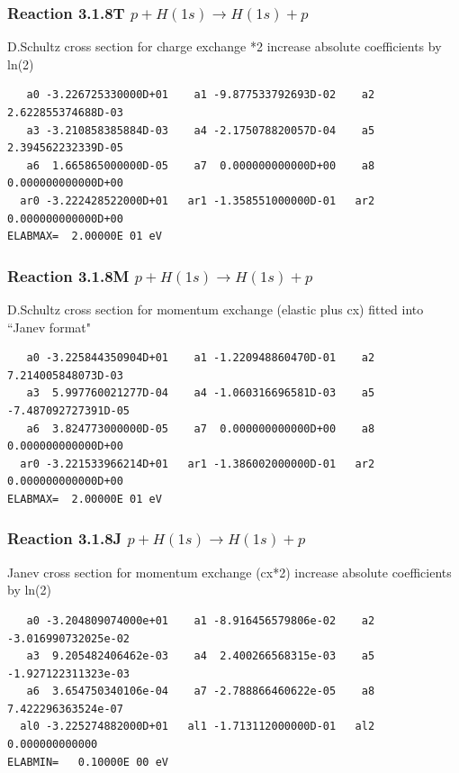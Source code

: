 \documentclass[12pt,dvips]{article}
\begin{document}
\subsubsection{
Reaction 3.1.8T $  p + H(1s) \rightarrow H(1s) + p  $
}
D.Schultz cross section for charge exchange *2
increase absolute coefficients by ln(2)

\begin{small}\begin{verbatim}
   a0 -3.226725330000D+01    a1 -9.877533792693D-02    a2  2.622855374688D-03
   a3 -3.210858385884D-03    a4 -2.175078820057D-04    a5  2.394562232339D-05
   a6  1.665865000000D-05    a7  0.000000000000D+00    a8  0.000000000000D+00
  ar0 -3.222428522000D+01   ar1 -1.358551000000D-01   ar2  0.000000000000D+00
ELABMAX=  2.00000E 01 eV
\end{verbatim}\end{small}

\subsubsection{
Reaction 3.1.8M $  p + H(1s) \rightarrow H(1s) + p  $
}
D.Schultz cross section for momentum exchange (elastic plus cx)
fitted into ``Janev format"

\begin{small}\begin{verbatim}
   a0 -3.225844350904D+01    a1 -1.220948860470D-01    a2  7.214005848073D-03
   a3  5.997760021277D-04    a4 -1.060316696581D-03    a5 -7.487092727391D-05
   a6  3.824773000000D-05    a7  0.000000000000D+00    a8  0.000000000000D+00
  ar0 -3.221533966214D+01   ar1 -1.386002000000D-01   ar2  0.000000000000D+00
ELABMAX=  2.00000E 01 eV
\end{verbatim}\end{small}
\subsubsection{
Reaction 3.1.8J $  p + H(1s) \rightarrow H(1s) + p  $
}
Janev cross section for momentum exchange (cx*2)
increase absolute coefficients by ln(2)

\begin{small}\begin{verbatim}
   a0 -3.204809074000e+01    a1 -8.916456579806e-02    a2 -3.016990732025e-02
   a3  9.205482406462e-03    a4  2.400266568315e-03    a5 -1.927122311323e-03
   a6  3.654750340106e-04    a7 -2.788866460622e-05    a8  7.422296363524e-07
  al0 -3.225274882000D+01   al1 -1.713112000000D-01   al2  0.000000000000
ELABMIN=   0.10000E 00 eV
\end{verbatim}\end{small}
\end{document}
